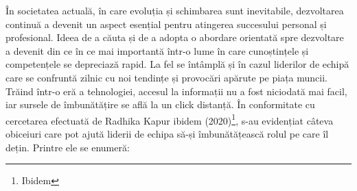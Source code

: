 \documentclass[a4paper, 12pt]{article}
\begin{document}
	\space\quad\quad  În societatea actuală, în care evoluția și schimbarea sunt inevitabile, dezvoltarea continuă a devenit un aspect esențial pentru atingerea succesului personal și profesional. Ideea de a căuta și de a adopta o abordare orientată spre dezvoltare a devenit din ce în ce mai importantă într-o lume în care cunoștințele și competențele se depreciază rapid. La fel se întâmplă și în cazul liderilor de echipă care se confruntă zilnic cu noi tendințe și provocări apărute pe piața muncii. Trăind într-o eră a tehnologiei, accesul la informații nu a fost niciodată mai facil, iar sursele de îmbunătățire se află la un click distanță. În conformitate cu cercetarea efectuată de Radhika Kapur ibidem (2020)\footnote{Ibidem}, s-au evidențiat câteva obiceiuri care pot ajută liderii de echipa să-și îmbunătățească rolul pe care îl dețin. Printre ele se enumeră:
	
\end{document}
